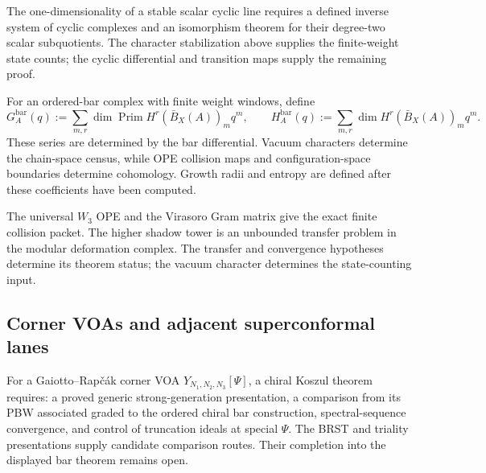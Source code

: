 \begin{theorem}
\label{thm:winfty-scalar}
\ClaimStatusOpen
The one-dimensionality of a stable scalar cyclic line requires a
defined inverse system of cyclic complexes and an isomorphism theorem
for their degree-two scalar subquotients.  The character stabilization
above supplies the finite-weight state counts; the cyclic differential
and transition maps supply the remaining proof.
\end{theorem}

\begin{remark}
\label{prop:virasoro-primitive}
\label{prop:virasoro-entropy}
\label{comp:w3-naive-corrected}
\label{prop:w3-entropy}
\label{prop:wn-entropy-ladder}
\label{prop:winfty-bar-window}
\ClaimStatusOpen
For an ordered-bar complex with finite weight windows, define
\begin{equation}
\label{eq:virasoro-primitive}
\label{eq:w3-naive-primitive}
\label{eq:w3-naive-window}
\label{eq:w3-lambda-coproduct}
\label{eq:w3-corrected-primitive}
\label{eq:w3-corrected-window}
\label{eq:w3-corrected-recursion}
G_A^{\mathrm{bar}}(q)
:=\sum_{m,r}\dim
\operatorname{Prim}H^r\!\left(\bar B_X(A)\right)_m q^m,
\qquad
H_A^{\mathrm{bar}}(q)
:=\sum_{m,r}\dim H^r\!\left(\bar B_X(A)\right)_m q^m.
\end{equation}
These series are determined by the bar differential.  Vacuum
characters determine the chain-space census, while OPE collision
maps and configuration-space boundaries determine cohomology.
Growth radii and entropy are defined after these coefficients have
been computed.
\end{remark}

\begin{remark}
\label{sec:higher-w-shadow-data}
The universal \(W_3\) OPE and the Virasoro Gram matrix give the exact
finite collision packet.  The higher shadow tower is an unbounded
transfer problem in the modular deformation complex.  The transfer
and convergence hypotheses determine its theorem status; the vacuum
character determines the state-counting input.
\end{remark}

\subsection{Corner VOAs and adjacent superconformal lanes}
\label{sec:y-algebra-koszulness}

\begin{theorem}
\label{thm:y-algebra-koszulness}
\ClaimStatusOpen
For a Gaiotto--Rap\v{c}\'ak corner VOA
\(Y_{N_1,N_2,N_3}[\Psi]\), a chiral Koszul theorem requires:
a proved generic strong-generation presentation, a comparison from
its PBW associated graded to the ordered chiral bar construction,
spectral-sequence convergence, and control of truncation ideals at
special \(\Psi\).  The BRST and triality presentations supply
candidate comparison routes.  Their completion into the displayed
bar theorem remains open.
\end{theorem}

